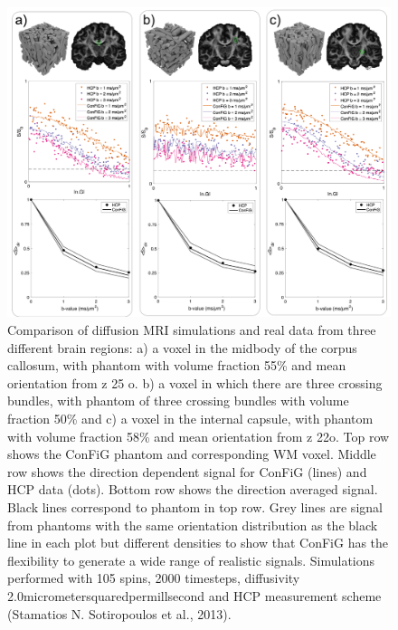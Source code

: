 \begin{figure}
  \centering
  \includegraphics[width=\textwidth]{figures/config/hcp_vs_sim_new_review_2_whitebg.png}
  \caption[dMRI signals from \acs{HCP} subject and \ac{ConFiG} phantoms ]{Comparison of diffusion \ac{MRI} simulations and real data from three different brain regions:  a) a voxel  in the midbody of the corpus callosum, with phantom with volume fraction 55\% and mean orientation from z 25 o. b) a voxel  in which there are three crossing bundles, with phantom of three crossing bundles with volume fraction 50\% and c) a voxel in the internal capsule, with phantom with volume fraction 58\% and mean orientation from z 22o. Top row shows the \ac{ConFiG} phantom and corresponding \ac{WM} voxel. Middle row shows the direction dependent signal for \ac{ConFiG} (lines) and \ac{HCP} data (dots). Bottom row shows the direction averaged signal. Black lines correspond to phantom in top row. Grey lines are signal from phantoms with the same orientation distribution as the black line in each plot but different densities to show that \ac{ConFiG} has the flexibility to generate a wide range of realistic signals. Simulations performed with 105 spins, 2000 timesteps, diffusivity 2.0micrometersquaredpermillsecond  and \ac{HCP} measurement scheme (Stamatios N. Sotiropoulos et al., 2013). }
  \label{fig:config_res_dMRI}
\end{figure}

